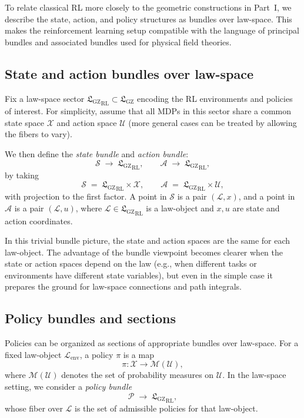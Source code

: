 \documentclass[11pt]{book}
\newcommand{\GZLS}{\ensuremath{\mathfrak{L}_{\mathrm{GZ}}}}
\theoremstyle{plain}
\theoremstyle{definition}
\theoremstyle{remark}
\begin{document}
To relate classical RL more closely to the geometric constructions in
Part~I, we describe the state, action, and policy structures as
bundles over law-space. This makes the reinforcement learning setup
compatible with the language of principal bundles and associated
bundles used for physical field theories.

\subsection*{State and action bundles over law-space}

Fix a law-space sector ${\GZLS}_{\mathrm{RL}} \subset \GZLS$ encoding
the RL environments and policies of interest. For simplicity, assume
that all MDPs in this sector share a common state space
$\mathcal{X}$ and action space $\mathcal{U}$ (more general cases can
be treated by allowing the fibers to vary).

We then define the \emph{state bundle} and \emph{action bundle}:
\[
   \mathcal{S} \;\longrightarrow\; {\GZLS}_{\mathrm{RL}},
   \qquad
   \mathcal{A} \;\longrightarrow\; {\GZLS}_{\mathrm{RL}},
\]
by taking
\[
   \mathcal{S} \;=\; {\GZLS}_{\mathrm{RL}} \times \mathcal{X},
   \qquad
   \mathcal{A} \;=\; {\GZLS}_{\mathrm{RL}} \times \mathcal{U},
\]
with projection to the first factor. A point in $\mathcal{S}$ is a
pair $(\mathcal{L},x)$, and a point in $\mathcal{A}$ is a pair
$(\mathcal{L},u)$, where $\mathcal{L} \in {\GZLS}_{\mathrm{RL}}$ is a
law-object and $x,u$ are state and action coordinates.

In this trivial bundle picture, the state and action spaces are the
same for each law-object. The advantage of the bundle viewpoint
becomes clearer when the state or action spaces depend on the law
(e.g., when different tasks or environments have different state
variables), but even in the simple case it prepares the ground for
law-space connections and path integrals.

\subsection*{Policy bundles and sections}

Policies can be organized as sections of appropriate bundles over
law-space. For a fixed law-object $\mathcal{L}_{\mathrm{env}}$, a
policy $\pi$ is a map
\[
   \pi \colon \mathcal{X} \longrightarrow \mathcal{M}(\mathcal{U}),
\]
where $\mathcal{M}(\mathcal{U})$ denotes the set of probability
measures on $\mathcal{U}$. In the law-space setting, we consider a
\emph{policy bundle}
\[
   \mathcal{P} \;\longrightarrow\; {\GZLS}_{\mathrm{RL}},
\]
whose fiber over $\mathcal{L}$ is the set of admissible policies for
that law-object.
\end{document}
